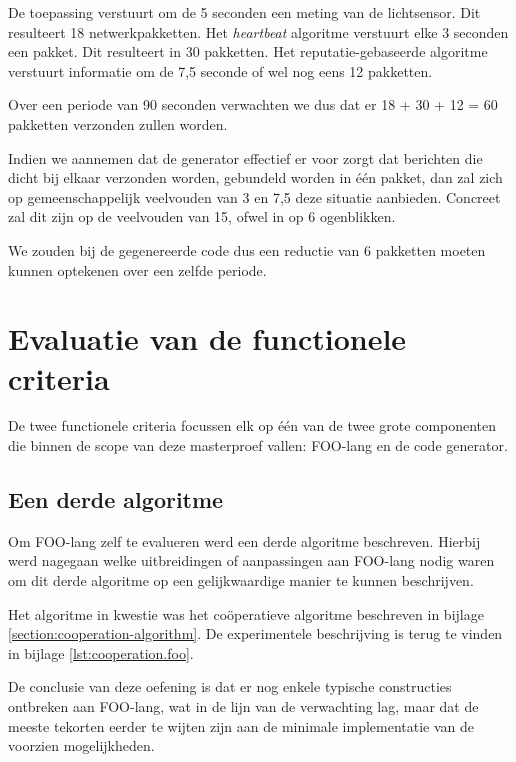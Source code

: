De toepassing verstuurt om de 5 seconden een meting van de lichtsensor. Dit
resulteert 18 netwerkpakketten. Het \emph{heartbeat} algoritme verstuurt elke 3
seconden een pakket. Dit resulteert in 30 pakketten. Het reputatie-gebaseerde
algoritme verstuurt informatie om de 7,5 seconde of wel nog eens 12 pakketten.

Over een periode van 90 seconden verwachten we dus dat er 18 + 30 + 12 = 60
pakketten verzonden zullen worden.

Indien we aannemen dat de generator effectief er voor zorgt dat berichten die
dicht bij elkaar verzonden worden, gebundeld worden in \'e\'en pakket, dan zal
zich op gemeenschappelijk veelvouden van 3 en 7,5 deze situatie aanbieden.
Concreet zal dit zijn op de veelvouden van 15, ofwel in op 6 ogenblikken.

We zouden bij de gegenereerde code dus een reductie van 6 pakketten moeten
kunnen optekenen over een zelfde periode.

\vspace{-3mm}

\section{Evaluatie van de functionele criteria}
\label{section:evaluation-functionals}

De twee functionele criteria focussen elk op \'e\'en van de twee grote
componenten die binnen de scope van deze masterproef vallen: FOO-lang en de
code generator.

\vspace{-3mm}

\subsection{Een derde algoritme}

Om FOO-lang zelf te evalueren werd een derde algoritme beschreven. Hierbij werd
nagegaan welke uitbreidingen of aanpassingen aan FOO-lang nodig waren om dit
derde algoritme op een gelijkwaardige manier te kunnen beschrijven.

Het algoritme in kwestie was het co\"operatieve algoritme beschreven in bijlage
\ref{section:cooperation-algorithm}. De experimentele beschrijving is terug te
vinden in bijlage \ref{lst:cooperation.foo}.

De conclusie van deze oefening is dat er nog enkele typische constructies
ontbreken aan FOO-lang, wat in de lijn van de verwachting lag, maar dat de
meeste tekorten eerder te wijten zijn aan de minimale implementatie van de
voorzien mogelijkheden.


